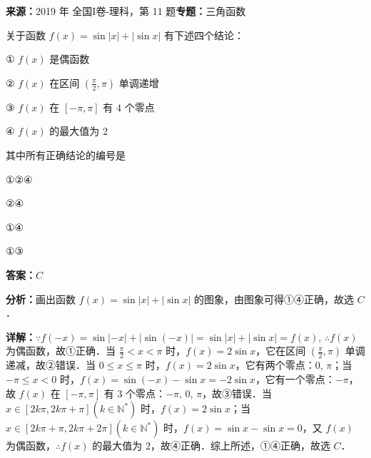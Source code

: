 \begin{question}[points=5]
\textbf{来源：}2019 年 全国I卷-理科，第 11 题\quad \textbf{专题：}三角函数\par
关于函数 $f(x) = \sin|x| + |\sin x|$ 有下述四个结论：

① $f(x)$ 是偶函数

② $f(x)$ 在区间 $\left(\frac{\pi}{2}, \pi\right)$ 单调递增

③ $f(x)$ 在 $[-\pi, \pi]$ 有 $4$ 个零点

④ $f(x)$ 的最大值为 $2$

其中所有正确结论的编号是
\begin{choices}
  \item ①②④
  \item ②④
  \item ①④
  \item ①③
\end{choices}
\begin{solution}
\textbf{答案：}$C$

\textbf{分析：}画出函数 $f(x) = \sin|x| + |\sin x|$ 的图象，由图象可得①④正确，故选 $C$．

\textbf{详解：}$\because f(-x) = \sin|-x| + |\sin(-x)| = \sin|x| + |\sin x| = f(x)$, $\therefore f(x)$ 为偶函数，故①正确．当 $\frac{\pi}{2} < x < \pi$ 时，$f(x) = 2\sin x$，它在区间 $\left(\frac{\pi}{2}, \pi\right)$ 单调递减，故②错误．当 $0 \le x \le \pi$ 时，$f(x) = 2\sin x$，它有两个零点：$0$, $\pi$；当 $-\pi \le x < 0$ 时，$f(x) = \sin(-x) - \sin x = -2\sin x$，它有一个零点：$-\pi$，故 $f(x)$ 在 $[-\pi, \pi]$ 有 $3$ 个零点：$-\pi$, $0$, $\pi$，故③错误．当 $x \in [2k\pi, 2k\pi + \pi] (k \in \mathbb{N}^*)$ 时，$f(x) = 2\sin x$；当 $x \in [2k\pi + \pi, 2k\pi + 2\pi] (k \in \mathbb{N}^*)$ 时，$f(x) = \sin x - \sin x = 0$，又 $f(x)$ 为偶函数，$\therefore f(x)$ 的最大值为 $2$，故④正确．综上所述，①④正确，故选 $C$．
\end{solution}
\end{question}

